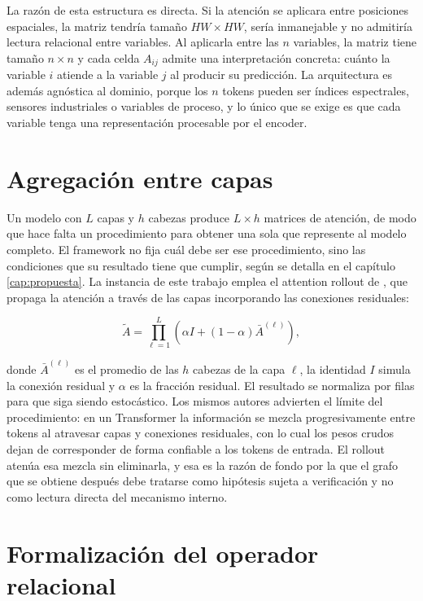 La razón de esta estructura es directa. Si la atención se aplicara entre posiciones espaciales, la matriz tendría tamaño $HW \times HW$, sería inmanejable y no admitiría lectura relacional entre variables. Al aplicarla entre las $n$ variables, la matriz tiene tamaño $n \times n$ y cada celda $A_{ij}$ admite una interpretación concreta: cuánto la variable $i$ atiende a la variable $j$ al producir su predicción. La arquitectura es además agnóstica al dominio, porque los $n$ tokens pueden ser índices espectrales, sensores industriales o variables de proceso, y lo único que se exige es que cada variable tenga una representación procesable por el encoder.

\section{Agregación entre capas}

Un modelo con $L$ capas y $h$ cabezas produce $L \times h$ matrices de atención, de modo que hace falta un procedimiento para obtener una sola que represente al modelo completo. El framework no fija cuál debe ser ese procedimiento, sino las condiciones que su resultado tiene que cumplir, según se detalla en el capítulo \ref{cap:propuesta}. La instancia de este trabajo emplea el attention rollout de \textcite{abnar2020quantifying}, que propaga la atención a través de las capas incorporando las conexiones residuales:

\begin{equation}
\tilde{A} = \prod_{\ell=1}^{L}\left( \alpha I + (1-\alpha) \bar{A}^{(\ell)} \right),
\end{equation}

donde $\bar{A}^{(\ell)}$ es el promedio de las $h$ cabezas de la capa $\ell$, la identidad $I$ simula la conexión residual y $\alpha$ es la fracción residual. El resultado se normaliza por filas para que siga siendo estocástico. Los mismos autores advierten el límite del procedimiento: en un Transformer la información se mezcla progresivamente entre tokens al atravesar capas y conexiones residuales, con lo cual los pesos crudos dejan de corresponder de forma confiable a los tokens de entrada. El rollout atenúa esa mezcla sin eliminarla, y esa es la razón de fondo por la que el grafo que se obtiene después debe tratarse como hipótesis sujeta a verificación y no como lectura directa del mecanismo interno.

\section{Formalización del operador relacional}

